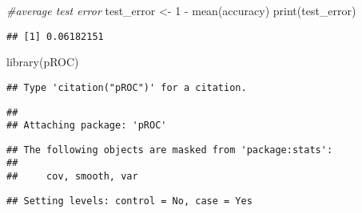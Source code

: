 \documentclass[
]{article}
\newenvironment{Shaded}{\begin{snugshade}}{\end{snugshade}}
\newcommand{\AttributeTok}[1]{\textcolor[rgb]{0.77,0.63,0.00}{#1}}
\newcommand{\CommentTok}[1]{\textcolor[rgb]{0.56,0.35,0.01}{\textit{#1}}}
\newcommand{\ConstantTok}[1]{\textcolor[rgb]{0.00,0.00,0.00}{#1}}
\newcommand{\DecValTok}[1]{\textcolor[rgb]{0.00,0.00,0.81}{#1}}
\newcommand{\FunctionTok}[1]{\textcolor[rgb]{0.00,0.00,0.00}{#1}}
\newcommand{\NormalTok}[1]{#1}
\newcommand{\OtherTok}[1]{\textcolor[rgb]{0.56,0.35,0.01}{#1}}
\newcommand{\SpecialCharTok}[1]{\textcolor[rgb]{0.00,0.00,0.00}{#1}}
\newcommand{\StringTok}[1]{\textcolor[rgb]{0.31,0.60,0.02}{#1}}
\begin{document}
\begin{Shaded}
\begin{Highlighting}[]
\CommentTok{\#average test error}
\NormalTok{test\_error }\OtherTok{\textless{}{-}} \DecValTok{1} \SpecialCharTok{{-}} \FunctionTok{mean}\NormalTok{(accuracy)}
\FunctionTok{print}\NormalTok{(test\_error)}
\end{Highlighting}
\end{Shaded}

\begin{verbatim}
## [1] 0.06182151
\end{verbatim}

\begin{Shaded}
\begin{Highlighting}[]
\FunctionTok{library}\NormalTok{(pROC) }
\end{Highlighting}
\end{Shaded}

\begin{verbatim}
## Type 'citation("pROC")' for a citation.
\end{verbatim}

\begin{verbatim}
## 
## Attaching package: 'pROC'
\end{verbatim}

\begin{verbatim}
## The following objects are masked from 'package:stats':
## 
##     cov, smooth, var
\end{verbatim}

\begin{Shaded}
\end{Shaded}

\begin{verbatim}
## Setting levels: control = No, case = Yes
\end{verbatim}
\end{document}
